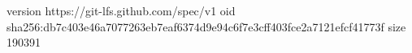 version https://git-lfs.github.com/spec/v1
oid sha256:db7c403e46a7077263eb7eaf6374d9e94c6f7e3cff403fce2a7121efcf41773f
size 190391
